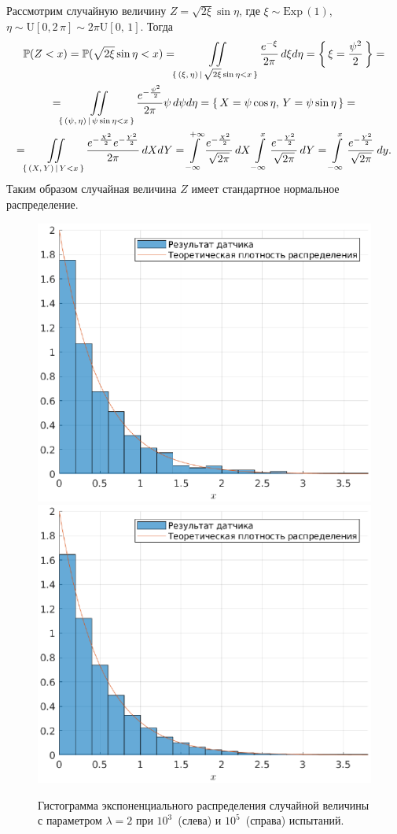 Рассмотрим случайную величину $Z = \sqrt{2\xi}\sin\eta$, где $\xi\sim\mbox{Exp}\,(1)$, $\eta\sim\mbox{U}[0,2\,\pi] \sim 2\pi\mbox{U}[0,\,1]$. Тогда
\begin{multline*}
        \mathbb{P}(Z < x)
        =
        \mathbb{P}(\sqrt{2\xi}\sin\eta < x)
        =
        \iint\limits_{\{\,(\xi,\,\eta)\,|\,\sqrt{2\xi}\sin\eta<x\,\}} \frac{e^{-\xi}}{2\pi}\,d\xi d\eta
        =
        \left\{\,\xi = \frac{\psi^2}{2}\,\right\}
        = \\ =
        \iint\limits_{\{\,(\psi,\,\eta)\,|\,\psi\sin\eta<x\,\}} \frac{e^{-\frac{\psi^2}{2}}}{2\pi}\psi\,d\psi d\eta
        =
        \{\,X = \psi\cos\eta,\,Y = \psi\sin\eta\,\}
        = \\ =
        \iint\limits_{\{\,(X,\,Y)\,|\,Y < x\,\}} \frac{e^{-\frac{X^2}{2}}e^{-\frac{Y^2}{2}}}{2\pi}\,dXdY
        =
        \int\limits_{-\infty}^{+\infty}\frac{e^{-\frac{X^2}{2}}}{\sqrt{2\pi}}\,dX \int\limits_{-\infty}^{x} \frac{e^{-\frac{Y^2}{2}}}{\sqrt{2\pi}}\,dY
        =
        \int\limits_{-\infty}^{x}\frac{e^{-\frac{Y^2}{2}}}{\sqrt{2\pi}}\,dy.
\end{multline*}
Таким образом случайная величина $Z$ имеет стандартное нормальное распределение.
\clearpage
\begin{figure}[t]
        \includegraphics[width=0.5\linewidth]{task_03/exp2-1000.eps}
        \includegraphics[width=0.5\linewidth]{task_03/exp2-100000.eps}
        \caption{Гистограмма экспоненциального распределения случайной величины с параметром $\lambda = 2$ при $10^3$~(слева) и $10^5$~(справа) испытаний.}
\end{figure}
